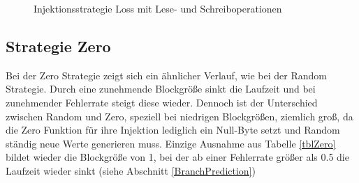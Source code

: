 \begin{figure}[!htb]

\caption[Messung Loss Strategie]{Injektionsstrategie Loss mit Lese- und Schreiboperationen}
\label{diaLoss}
\end{figure}


\subsection*{Strategie Zero}

Bei der Zero Strategie zeigt sich ein \"ahnlicher Verlauf, wie bei der Random Strategie. Durch eine zunehmende Blockgr\"o\ss e sinkt die Laufzeit und bei zunehmender Fehlerrate steigt diese wieder. Dennoch ist der Unterschied zwischen Random und Zero, speziell bei niedrigen Blockgr\"o\ss en, ziemlich gro\ss, da die Zero Funktion f\"ur ihre Injektion lediglich ein Null-Byte setzt und Random st\"andig neue Werte generieren muss. Einzige Ausnahme aus Tabelle \ref{tblZero} bildet wieder die Blockgr\"o\ss e von 1, bei der ab einer Fehlerrate gr\"o\ss er als 0.5 die Laufzeit wieder sinkt (siehe Abschnitt \ref{BranchPrediction})

